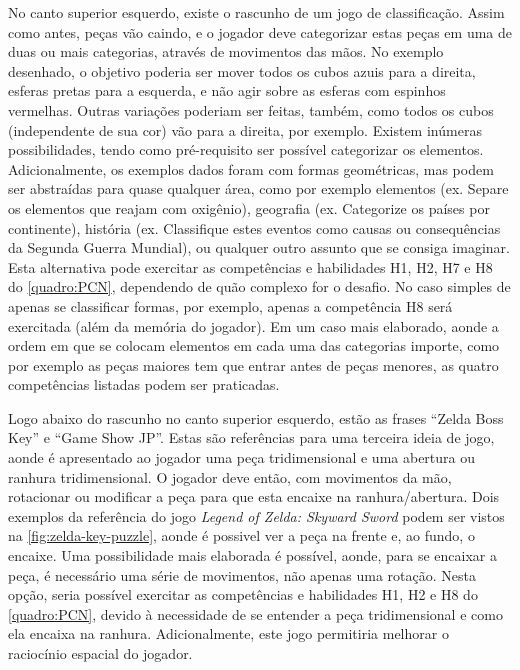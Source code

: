 No canto superior esquerdo, existe o rascunho de um jogo de 
classificação. Assim como antes, peças vão caindo, e o jogador 
deve categorizar estas peças em uma de duas ou mais categorias, 
através de movimentos das mãos. No exemplo desenhado, o 
objetivo poderia ser mover todos os cubos azuis para a direita, 
esferas pretas para a esquerda, e não agir sobre as esferas 
com espinhos vermelhas. Outras variações poderiam ser feitas, 
também, como todos os cubos (independente de sua cor) vão 
para a direita, por exemplo. Existem inúmeras possibilidades, 
tendo como pré-requisito ser possível categorizar os elementos. 
Adicionalmente, os exemplos dados foram com formas geométricas, 
mas podem ser abstraídas para quase qualquer área, como por 
exemplo elementos (ex. Separe os elementos que reajam com 
oxigênio), geografia (ex. Categorize os países por continente), 
história (ex. Classifique estes eventos como causas ou 
consequências da Segunda Guerra Mundial), ou qualquer outro 
assunto que se consiga imaginar. Esta alternativa pode 
exercitar as competências e habilidades H1, H2, H7 e H8 do 
\autoref{quadro:PCN}, dependendo de quão complexo for o desafio. 
No caso simples de apenas se classificar formas, por exemplo,
apenas a competência H8 será exercitada (além da memória do jogador). Em um caso mais elaborado, 
aonde a ordem em que se colocam elementos em cada uma das categorias 
importe, como por exemplo as peças maiores tem que entrar antes de 
peças menores, as quatro competências listadas podem ser praticadas.

Logo abaixo do rascunho no canto superior esquerdo, estão as 
frases ``Zelda Boss Key'' e ``Game Show JP''. Estas são referências 
para uma terceira ideia de jogo, aonde é apresentado ao jogador 
uma peça tridimensional e uma abertura ou ranhura tridimensional. 
O jogador deve então, com movimentos da mão, rotacionar ou modificar 
a peça para que esta encaixe na ranhura/abertura. Dois exemplos da 
referência do jogo \textit{Legend of Zelda: Skyward Sword} podem 
ser vistos na \autoref{fig:zelda-key-puzzle}, aonde é possivel ver
a peça na frente e, ao fundo, o encaixe. Uma possibilidade mais elaborada 
é possível, aonde, para se encaixar a peça, é necessário uma série 
de movimentos, não apenas uma rotação. Nesta opção, seria possível 
exercitar as competências e habilidades H1, H2 e H8 do 
\autoref{quadro:PCN}, devido à necessidade de se entender a peça 
tridimensional e como ela encaixa na ranhura. Adicionalmente, este 
jogo permitiria melhorar o raciocínio espacial do jogador.

